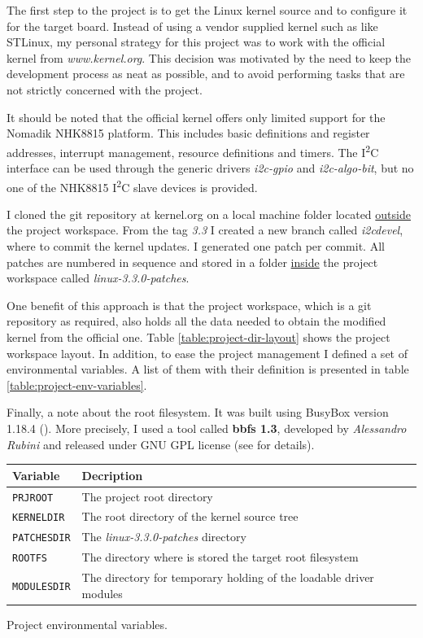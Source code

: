 \documentclass[a4paper,10pt]{article}
\makeatletter
\newenvironment{tablehere}{\def\@captype{table}}{}
\newcommand{\icc}{I\textsuperscript{2}C }
\makeatother
\begin{document}
\begin{multicols}{2}
The first step to the project is to get the Linux kernel source and to configure
it for the target board. Instead of  using a vendor supplied kernel such as like
STLinux, my personal strategy for this project was to work with the official
kernel from \emph{www.kernel.org}.
This decision was motivated by the need to keep the development process as neat
as possible, and to avoid performing tasks that are not strictly concerned with
the project.

It should be noted that the official kernel offers only limited support for the
Nomadik  NHK8815 platform.
This includes basic definitions and register addresses, interrupt management,
resource definitions and timers. The \icc interface can be used through the
generic drivers \emph{i2c-gpio} and \emph{i2c-algo-bit}, but no one of the
NHK8815 \icc slave devices is provided.

I cloned the git repository at kernel.org on a local machine folder
located \underline{outside} the project workspace. From the tag \emph{3.3}
I created a new branch called \emph{i2cdevel}, where to commit the kernel updates.
I generated one patch per commit. All patches are numbered in sequence and
stored in a folder \underline{inside} the project workspace called
\emph{linux-3.3.0-patches}.

One benefit of this approach is that the project workspace, which is a git
repository as required, also holds all the data needed to obtain the modified
kernel from the official one.
Table \ref{table:project-dir-layout} shows the project workspace layout.
In addition, to ease the project management I defined a set of environmental
variables. A list of them with their definition is presented in table
\ref{table:project-env-variables}.

Finally, a note about the root filesystem. It was built using BusyBox
version 1.18.4 (\cite{busybox}). More precisely, I used a tool called
\textbf{bbfs 1.3}, developed by \emph{Alessandro Rubini} and released under
GNU GPL license (see \cite{bbfs1.3} for details).\\

\begin{tablehere}
	\centering
	\renewcommand{\arraystretch}{1.2}	
	\begin{tabular}{l p{5.5cm}}
		\hline
		Variable & Decription \\
		\hline
		\texttt{PRJROOT} & The project root directory\\
		\texttt{KERNELDIR} & The root directory of the kernel source tree \\
		\texttt{PATCHESDIR} & The \emph{linux-3.3.0-patches} directory \\
		\texttt{ROOTFS} & The directory where is stored the target root
			filesystem \\
		\texttt{MODULESDIR} & The directory for temporary holding of the
			loadable driver modules \\
		\hline
	\end{tabular}
	\caption{Project environmental variables.}
	\label{table:project-env-variables}
\end{tablehere}



\end{multicols}
\end{document}
